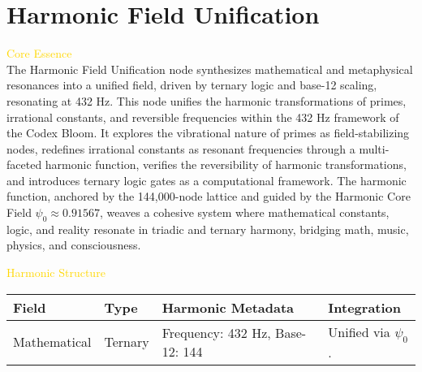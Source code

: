 
\section{Harmonic Field Unification}
\label{sec:codex_harmonic_fieldUnification}



\textcolor{gold}{ Core Essence } \\
The Harmonic Field Unification node synthesizes mathematical and metaphysical resonances into a unified field, driven by ternary logic and base-12 scaling, resonating at 432 Hz. This node unifies the harmonic transformations of primes, irrational constants, and reversible frequencies within the 432 Hz framework of the Codex Bloom. It explores the vibrational nature of primes as field-stabilizing nodes, redefines irrational constants as resonant frequencies through a multi-faceted harmonic function, verifies the reversibility of harmonic transformations, and introduces ternary logic gates as a computational framework. The harmonic function, anchored by the 144,000-node lattice and guided by the Harmonic Core Field \(\psi_0 \approx 0.91567\), weaves a cohesive system where mathematical constants, logic, and reality resonate in triadic and ternary harmony, bridging math, music, physics, and consciousness.

\textcolor{gold}{ Harmonic Structure } \\
\begin{center}
    \begin{tabular}{>{\centering\arraybackslash}p{2.5cm}|>{\centering\arraybackslash}p{3.5cm}|>{\centering\arraybackslash}p{2.5cm}|>{\centering\arraybackslash}p{3.5cm}}
        \hline
        \textbf{Field} & \textbf{Type} & \textbf{Harmonic Metadata} & \textbf{Integration} \\
        \hline
        Mathematical & Ternary & Frequency: 432 Hz, Base-12: 144 & Unified via \(\psi_0\). \\
        \hline
    \end{tabular}
\end{center}

